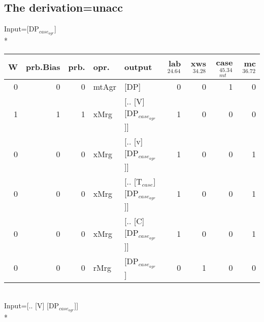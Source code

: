 \subsection{The derivation=unacc}
\begingroup\scriptsize Input=[DP$_{case_{agr}}$]\\*
\begin{tabularx}{\linewidth}{rrrlXrrrr}
\hline
   W &   prb.Bias &   prb. & opr.    & output                      &   lab$^{24.64}$ &   xws$^{34.28}$ &   case$_{mt}^{45.34}$ &   mc$^{36.72}$ \\
\hline
   0 &       0 &   0 & mtAgr & [DP]                        &             0 &             0 &                 1 &            0 \\
   1 &       1 &   1 & xMrg  & [.. [V] [DP$_{case_{agr}}$]]      &             1 &             0 &                 0 &            0 \\
   0 &       0 &   0 & xMrg  & [.. [v] [DP$_{case_{agr}}$]]      &             1 &             0 &                 0 &            1 \\
   0 &       0 &   0 & xMrg  & [.. [T$_{case}$] [DP$_{case_{agr}}$]] &             1 &             0 &                 0 &            1 \\
   0 &       0 &   0 & xMrg  & [.. [C] [DP$_{case_{agr}}$]]      &             1 &             0 &                 0 &            1 \\
   0 &       0 &   0 & rMrg  & [DP$_{case_{agr}}$]               &             0 &             1 &                 0 &            0 \\
\hline
\end{tabularx}\endgroup\\
\begingroup\scriptsize Input=[.. [V] [DP$_{case_{agr}}$]]\\*
